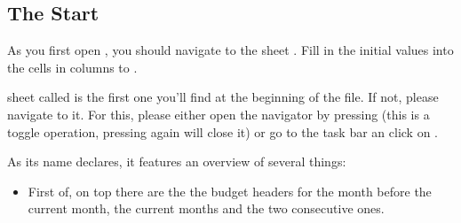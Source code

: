 \subsection{The Start}
\label{subsec:opening-the-file}

As you first open \tfn, you should navigate to the sheet .
Fill in the initial values into the cells in columns  to .

sheet called  is the first one you'll find at the beginning of the file.
If not, please navigate to it.
For this, please either open the navigator by pressing  (this is a toggle operation, pressing  again will close it) or go to the task bar an click on  \structurenext {}.

As its name declares, it features an overview of several things:
\begin{itemize}
	\item First of, on top there are the the budget headers for the month before the current month, the current months and the two consecutive ones.
\end{itemize}

